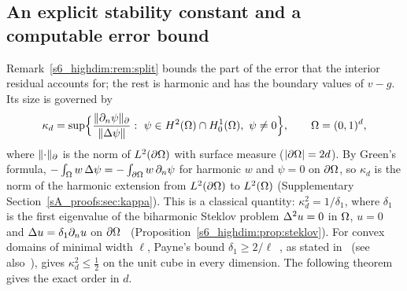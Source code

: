 \subsection{An explicit stability constant and a computable error bound}%
\label{s6_highdim:sec:bound}

Remark~\ref{s6_highdim:rem:split} bounds the part of the error that the interior residual
accounts for; the rest is harmonic and has the boundary values of $v-g$. Its size is governed by
\begin{equation}\label{s6_highdim:eq:kappa}
\kappa_d=\sup\Bigl\{\frac{\lVert \partial_n\psi\rVert_{\partial}}{\lVert \Delta\psi\rVert}:\ \psi\in H^2(\Omega)\cap H^1_0(\Omega),\
\psi\ne0\Bigr\},\qquad\Omega=(0,1)^d,
\end{equation}
where $\lVert \cdot\rVert_{\partial}$ is the norm of $L^2(\partial\Omega)$ with surface measure ($\lvert \partial\Omega\rvert=2d$). By
Green's formula, $-\int_\Omega w\,\Delta\psi=-\int_{\partial\Omega}w\,\partial_n\psi$ for harmonic $w$ and $\psi=0$ on
$\partial\Omega$, so $\kappa_d$ is the norm of the harmonic extension from $L^2(\partial\Omega)$ to $L^2(\Omega)$
(Supplementary Section~\ref{sA_proofs:sec:kappa}). This is a classical quantity:
$\kappa_d^2=1/\delta_1$, where $\delta_1$ is the first eigenvalue of the biharmonic Steklov
problem $\Delta^2u=0$ in $\Omega$, $u=0$ and $\Delta u=\delta_1\partial_n u$ on
$\partial\Omega$~\citep{ferrero2005fourth,bucur2009first,bucur2011first}
(Proposition~\ref{s6_highdim:prop:steklov}). For convex domains of minimal width $\ell$, Payne's
bound $\delta_1\ge2/\ell$~\citep{payne1968bounds}, as stated in~\citet[Lemma~5.3]{bucur2011first}
(see also~\citep{philippin2010extending}), gives
$\kappa_d^2\le\frac12$ on the unit cube in every dimension. The following theorem gives the exact
order in $d$.

\begin{theorem}\label{s6_highdim:thm:kappa}
\StmtKappa
\end{theorem}

\begin{proposition}\label{s6_highdim:prop:steklov}
\StmtSteklov
\end{proposition}

\begin{corollary}\label{s6_highdim:cor:bound}
\StmtCertificate
\end{corollary}

